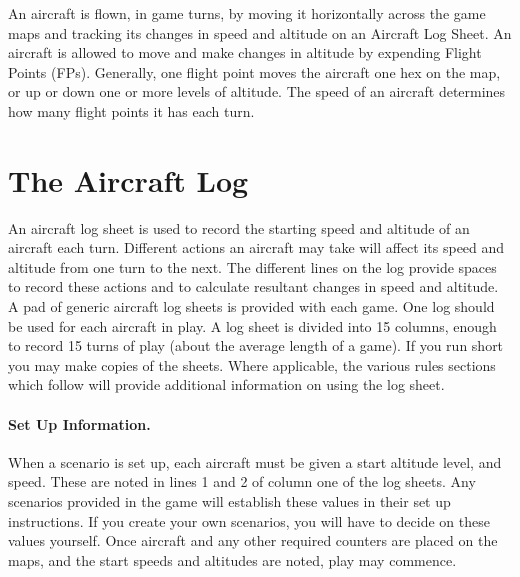 


An aircraft is flown, in game turns, by moving it horizontally across the game maps and tracking its changes in speed and altitude on an Aircraft Log Sheet. An aircraft is allowed to move and make changes in altitude by expending Flight Points (FPs). Generally, one flight point moves the aircraft one hex on the map, or up or down one or more levels of altitude. The speed of an aircraft determines how many flight points it has each turn.


\section{The Aircraft Log}
\label{rule:aircraft-log-sheets}

An aircraft log sheet is used to record the starting speed and altitude of an aircraft each turn. Different actions an aircraft may take will affect its speed and altitude from one turn to the next. The different lines on the log provide spaces to record these actions and to calculate resultant changes in speed and altitude. A pad of generic aircraft log sheets is provided with each game. One log should be used for each aircraft in play. A log sheet is divided into 15 columns, enough to record 15 turns of play (about the average length of a game). If you run short you may make copies of the sheets. Where applicable, the various rules sections which follow will provide additional information on using the log sheet.

\paragraph{Set Up Information.} 
When a scenario is set up, each aircraft must be given a start altitude level, and speed. These are noted in lines 1 and 2 of column one of the log sheets. Any scenarios provided in the game will establish these values in their set up instructions. If you create your own scenarios, you will have to decide on these values yourself. Once aircraft and any other required counters are placed on the maps, and the start speeds and altitudes are noted, play may commence.

